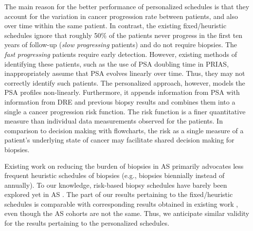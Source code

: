 \documentclass[a4paper, 12pt]{article}
\begin{document}
The main reason for the better performance of personalized schedules is that they account for the variation in cancer progression rate between patients, and also over time within the same patient. In contrast, the existing fixed/heuristic schedules ignore that roughly 50\% of the patients never progress in the first ten years of follow-up (\textit{slow progressing} patients) and do not require biopsies. The \textit{fast progressing} patients require early detection. However, existing methods of identifying these patients, such as the use of PSA doubling time in PRIAS, inappropriately assume that PSA evolves linearly over time. Thus, they may not correctly identify such patients. The personalized approach, however, models the PSA profiles non-linearly. Furthermore, it appends information from PSA with information from DRE and previous biopsy results and combines them into a single a cancer progression risk function. The risk function is a finer quantitative measure than individual data measurements observed for the patients. In comparison to decision making with flowcharts, the risk as a single measure of a patient's underlying state of cancer may facilitate shared decision making for biopsies.

Existing work on reducing the burden of biopsies in AS primarily advocates less frequent heuristic schedules of biopsies \citep{inoue2018comparative} (e.g., biopsies biennially instead of annually). To our knowledge, risk-based biopsy schedules have barely been explored yet in AS \citep{nieboer2018active,bruinsma2016active}. The part of our results pertaining to the fixed/heuristic schedules is comparable with corresponding results obtained in existing work \citep{inoue2018comparative}, even though the AS cohorts are not the same. Thus, we anticipate similar validity for the results pertaining to the personalized schedules.
\end{document}
